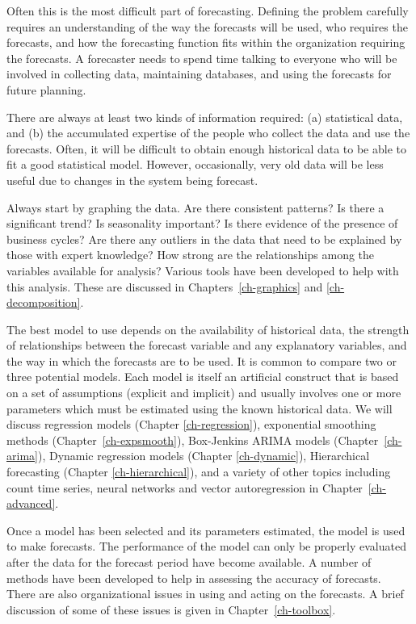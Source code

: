 \documentclass[]{book}
\providecommand{\tightlist}{%
  \setlength{\itemsep}{0pt}\setlength{\parskip}{0pt}}
\begin{document}
\begin{description}
\tightlist
\item[Step 1: Problem definition.]
Often this is the most difficult part of forecasting. Defining the problem carefully requires an understanding of the way the forecasts will be used, who requires the forecasts, and how the forecasting function fits within the organization requiring the forecasts. A forecaster needs to spend time talking to everyone who will be involved in collecting data, maintaining databases, and using the forecasts for future planning.
\item[Step 2: Gathering information.]
There are always at least two kinds of information required: (a) statistical data, and (b) the accumulated expertise of the people who collect the data and use the forecasts. Often, it will be difficult to obtain enough historical data to be able to fit a good statistical model. However, occasionally, very old data will be less useful due to changes in the system being forecast.
\item[Step 3: Preliminary (exploratory) analysis.]
Always start by graphing the data. Are there consistent patterns? Is there a significant trend? Is seasonality important? Is there evidence of the presence of business cycles? Are there any outliers in the data that need to be explained by those with expert knowledge? How strong are the relationships among the variables available for analysis? Various tools have been developed to help with this analysis. These are discussed in Chapters~\ref{ch-graphics} and \ref{ch-decomposition}.
\item[Step 4: Choosing and fitting models.]
The best model to use depends on the availability of historical data, the strength of relationships between the forecast variable and any explanatory variables, and the way in which the forecasts are to be used. It is common to compare two or three potential models. Each model is itself an artificial construct that is based on a set of assumptions (explicit and implicit) and usually involves one or more parameters which must be estimated using the known historical data. We will discuss regression models (Chapter \ref{ch-regression}), exponential smoothing methods (Chapter~\ref{ch-expsmooth}), Box-Jenkins ARIMA models (Chapter~\ref{ch-arima}), Dynamic regression models (Chapter \ref{ch-dynamic}), Hierarchical forecasting (Chapter \ref{ch-hierarchical}), and a variety of other topics including count time series, neural networks and vector autoregression in Chapter~\ref{ch-advanced}.
\item[Step 5: Using and evaluating a forecasting model.]
Once a model has been selected and its parameters estimated, the model is used to make forecasts. The performance of the model can only be properly evaluated after the data for the forecast period have become available. A number of methods have been developed to help in assessing the accuracy of forecasts. There are also organizational issues in using and acting on the forecasts. A brief discussion of some of these issues is given in Chapter~\ref{ch-toolbox}.
\end{description}
\end{document}
